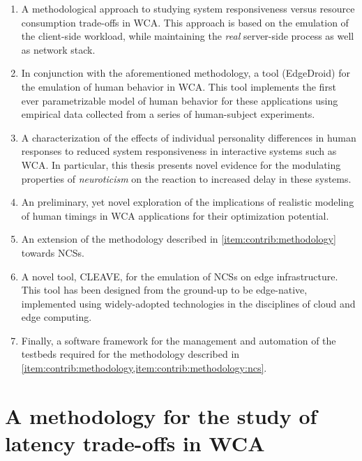 \begin{enumerate}
    \item\label{item:contrib:methodology} A methodological approach to studying system responsiveness versus resource consumption trade-offs in \ac{WCA}.
    This approach is based on the emulation of the client-side workload, while maintaining the \emph{real} server-side process as well as network stack.
    \item In conjunction with the aforementioned methodology, a tool (EdgeDroid) for the emulation of human behavior in \ac{WCA}.
    This tool implements the first ever parametrizable model of human behavior for these applications using empirical data collected from a series of human-subject experiments.
    \item A characterization of the effects of individual personality differences in human responses to reduced system responsiveness in interactive systems such as \acl{WCA}.
    In particular, this thesis presents novel evidence for the modulating properties of \emph{neuroticism} on the reaction to increased delay in these systems.
    \item An preliminary, yet novel exploration of the implications of realistic modeling of human timings in \ac{WCA} applications for their optimization potential.
    \item\label{item:contrib:methodology:ncs} An extension of the methodology described in \cref{item:contrib:methodology} towards \acp{NCS}.
    \item A novel tool, CLEAVE, for the emulation of \acp{NCS} on edge infrastructure.
    This tool has been designed from the ground-up to be edge-native, implemented using widely-adopted technologies in the disciplines of cloud and edge computing.
    \item Finally, a software framework for the management and automation of the testbeds required for the methodology described in \cref{item:contrib:methodology,item:contrib:methodology:ncs}.
\end{enumerate}

\section{A methodology for the study of latency trade-offs in \acs{WCA}}


